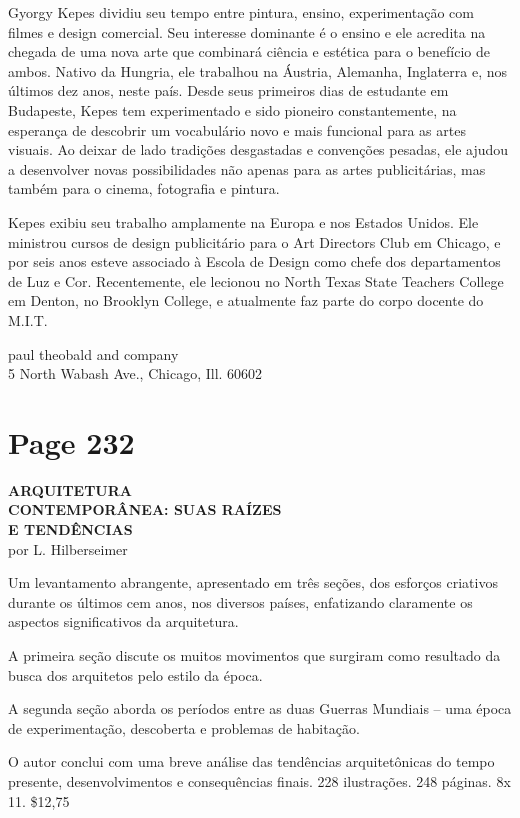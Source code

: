 \documentclass[a4paper]{article}
\begin{document}
Gyorgy Kepes dividiu seu tempo entre pintura, ensino, experimentação com filmes e design comercial. Seu interesse dominante é o ensino e ele acredita na chegada de uma nova arte que combinará ciência e estética para o benefício de ambos. Nativo da Hungria, ele trabalhou na Áustria, Alemanha, Inglaterra e, nos últimos dez anos, neste país. Desde seus primeiros dias de estudante em Budapeste, Kepes tem experimentado e sido pioneiro constantemente, na esperança de descobrir um vocabulário novo e mais funcional para as artes visuais. Ao deixar de lado tradições desgastadas e convenções pesadas, ele ajudou a desenvolver novas possibilidades não apenas para as artes publicitárias, mas também para o cinema, fotografia e pintura.

Kepes exibiu seu trabalho amplamente na Europa e nos Estados Unidos. Ele ministrou cursos de design publicitário para o Art Directors Club em Chicago, e por seis anos esteve associado à Escola de Design como chefe dos departamentos de Luz e Cor. Recentemente, ele lecionou no North Texas State Teachers College em Denton, no Brooklyn College, e atualmente faz parte do corpo docente do M.I.T.

\vfill
\centering
paul theobald and company \\
5 North Wabash Ave., Chicago, Ill. 60602

\newpage
\section*{Page 232}

\textbf{ARQUITETURA} \\
\textbf{CONTEMPORÂNEA: SUAS RAÍZES} \\
\textbf{E TENDÊNCIAS} \\
por L. Hilberseimer

Um levantamento abrangente, apresentado em três seções, dos esforços criativos durante os últimos cem anos, nos diversos países, enfatizando claramente os aspectos significativos da arquitetura.

A primeira seção discute os muitos movimentos que surgiram como resultado da busca dos arquitetos pelo estilo da época.

A segunda seção aborda os períodos entre as duas Guerras Mundiais -- uma época de experimentação, descoberta e problemas de habitação.

O autor conclui com uma breve análise das tendências arquitetônicas do tempo presente, desenvolvimentos e consequências finais. 228 ilustrações. 248 páginas. 8\textonehalf x 11.
\hfill \$12,75
\end{document}
